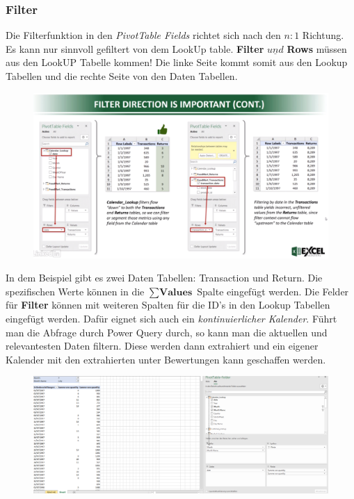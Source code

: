 \subsubsection{Filter}
Die Filterfunktion in den \textit{PivotTable Fields} richtet sich nach den $n:1$ Richtung. Es kann nur sinnvoll gefiltert von dem LookUp table. \textbf{Filter} $\underline{und}$ \textbf{Rows} müssen aus den LookUP Tabelle kommen! Die linke Seite kommt somit aus den Lookup Tabellen und die rechte Seite von den Daten Tabellen.
\begin{figure}[H]
	\centering
	\includegraphics[scale = 0.3]{attachment/chapter_1/screenshot063}
	\caption{}
	\label{fig:screenshot063}
\end{figure}
In dem Beispiel gibt es zwei Daten Tabellen: Transaction und Return. 
Die spezifischen Werte können in die $\sum \textbf{Values}$ Spalte eingefügt werden. Die Felder für \textbf{Filter} können mit weiteren Spalten für die ID's in den Lookup Tabellen eingefügt werden. Dafür eignet sich auch ein \textit{kontinuierlicher Kalender}. Führt man die Abfrage durch Power Query durch, so kann man die aktuellen und relevantesten Daten filtern. Diese werden dann extrahiert und ein eigener Kalender mit den extrahierten unter Bewertungen kann geschaffen werden. \\
\begin{figure}[H]
	\centering
	\includegraphics[scale = 0.3]{attachment/chapter_1/screenshot067}
	\caption{}
	\label{fig:screenshot067}
\end{figure}
